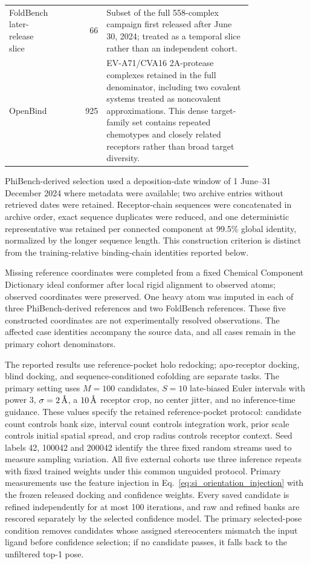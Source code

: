 \documentclass{article}
\newcommand{\angstrom}{\text{\normalfont\AA}}
\begin{document}
\begin{table}[htbp]
\begin{tabular}{>{\raggedright\arraybackslash}p{0.20\linewidth}r>{\raggedright\arraybackslash}p{0.60\linewidth}}
        FoldBench later-release slice & 66 & Subset of the full 558-complex campaign first released after June 30, 2024; treated as a temporal slice rather than an independent cohort. \\
        OpenBind & 925 & EV-A71/CVA16 2A-protease complexes retained in the full denominator, including two covalent systems treated as noncovalent approximations. This dense target-family set contains repeated chemotypes and closely related receptors rather than broad target diversity. \\
        \bottomrule
    \end{tabular}
\end{table}

PhiBench-derived selection used a deposition-date window of 1 June--31 December 2024 where metadata were available; two archive entries without retrieved dates were retained. Receptor-chain sequences were concatenated in archive order, exact sequence duplicates were reduced, and one deterministic representative was retained per connected component at 99.5\% global identity, normalized by the longer sequence length. This construction criterion is distinct from the training-relative binding-chain identities reported below.

Missing reference coordinates were completed from a fixed Chemical Component Dictionary ideal conformer after local rigid alignment to observed atoms; observed coordinates were preserved. One heavy atom was imputed in each of three PhiBench-derived references and two FoldBench references. These five constructed coordinates are not experimentally resolved observations. The affected case identities accompany the source data, and all cases remain in the primary cohort denominators.

The reported results use reference-pocket holo redocking; apo-receptor docking, blind docking, and sequence-conditioned cofolding are separate tasks.
The primary setting uses $M=100$ candidates, $S=10$ late-biased Euler intervals with power 3, $\sigma=2\,\angstrom$, a $10\,\angstrom$ receptor crop, no center jitter, and no inference-time guidance.
These values specify the retained reference-pocket protocol: candidate count controls bank size, interval count controls integration work, prior scale controls initial spatial spread, and crop radius controls receptor context. Seed labels 42, 100042 and 200042 identify the three fixed random streams used to measure sampling variation.
All five external cohorts use three inference repeats with fixed trained weights under this common unguided protocol.
Primary measurements use the feature injection in Eq.~\eqref{eq:si_orientation_injection} with the frozen released docking and confidence weights.
Every saved candidate is refined independently for at most 100 iterations, and raw and refined banks are rescored separately by the selected confidence model.
The primary selected-pose condition removes candidates whose assigned stereocenters mismatch the input ligand before confidence selection; if no candidate passes, it falls back to the unfiltered top-1 pose.
\end{document}
